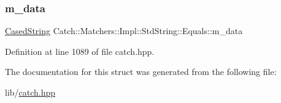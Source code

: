 \subsubsection{\texorpdfstring{m\+\_\+data}{m\_data}}
{\footnotesize\ttfamily \hyperlink{struct_catch_1_1_matchers_1_1_impl_1_1_std_string_1_1_cased_string}{Cased\+String} Catch\+::\+Matchers\+::\+Impl\+::\+Std\+String\+::\+Equals\+::m\+\_\+data}



Definition at line 1089 of file catch.\+hpp.



The documentation for this struct was generated from the following file\+:\begin{DoxyCompactItemize}
\item 
lib/\hyperlink{catch_8hpp}{catch.\+hpp}\end{DoxyCompactItemize}
